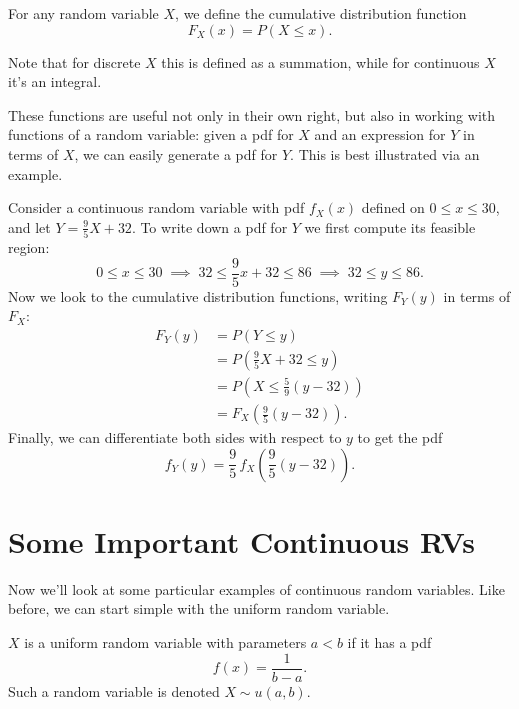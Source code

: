 \documentclass[../m157main.tex]{subfiles}
\begin{document}
\begin{definition}
    For any random variable $X$, we define the cumulative distribution function
    \[ F_X(x) = P(X \leq x). \]
\end{definition}

Note that for discrete $X$ this is defined as a summation, while for continuous $X$ it's an integral.

These functions are useful not only in their own right, but also in working with functions of a random variable: given a pdf for $X$ and an expression for $Y$ in terms of $X$, we can easily generate a pdf for $Y$.
This is best illustrated via an example.

\begin{example}    %
    Consider a continuous random variable with pdf $f_X(x)$ defined on $0 \leq x \leq 30$, and let $Y = \frac{9}{5} X + 32$.
    To write down a pdf for $Y$ we first compute its feasible region:
    \[ 0 \leq x \leq 30 \;\implies\; 32 \leq \frac{9}{5} x + 32 \leq 86 \;\implies\; 32 \leq y \leq 86. \]
    Now we look to the cumulative distribution functions, writing $F_Y(y)$ in terms of $F_X$:
    \begin{align*}
        F_Y(y) &= P(Y \leq y) \\
        &= P \left( \frac{9}{5} X + 32 \leq y \right) \\
        &= P \left( X \leq \frac{5}{9} (y - 32) \right) \\
        &= F_X \left( \frac{9}{5} (y - 32) \right).
    \end{align*}
    Finally, we can differentiate both sides with respect to $y$ to get the pdf
    \[ f_Y(y) = \frac{9}{5} \, f_X \left( \frac{9}{5} (y - 32) \right). \]
\end{example}

\section{Some Important Continuous RVs}
Now we'll look at some particular examples of continuous random variables.
Like before, we can start simple with the uniform random variable.

\begin{definition}
    $X$ is a uniform random variable with parameters $a < b$ if it has a pdf
    \[ f(x) = \frac{1}{b-a}. \]
    Such a random variable is denoted $X \sim u(a,b)$.
\end{definition}
\end{document}
